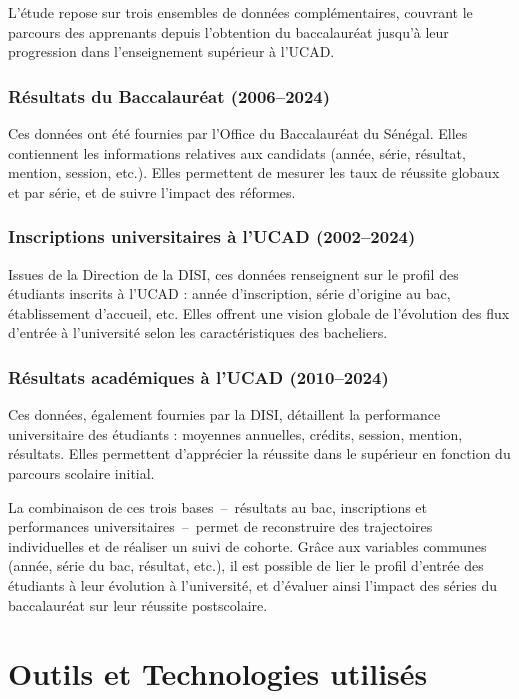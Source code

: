 L’étude repose sur trois ensembles de données complémentaires, couvrant le parcours des apprenants depuis l’obtention du baccalauréat jusqu’à leur progression dans l’enseignement supérieur à l’UCAD.

\subsubsection{Résultats du Baccalauréat (2006--2024)}

Ces données ont été fournies par l’Office du Baccalauréat du Sénégal. 
Elles contiennent les informations relatives aux candidats (année, série, résultat, mention, session, etc.). 
Elles permettent de mesurer les taux de réussite globaux et par série, et de suivre l’impact des réformes.

\subsubsection{Inscriptions universitaires à l’UCAD (2002--2024)}

Issues de la Direction de la DISI, ces données renseignent sur le profil des étudiants inscrits à l’UCAD : année d’inscription, série d’origine au bac, établissement d’accueil, etc. 
Elles offrent une vision globale de l’évolution des flux d’entrée à l’université selon les caractéristiques des bacheliers.

\subsubsection{Résultats académiques à l’UCAD (2010--2024)}

Ces données, également fournies par la DISI, détaillent la performance universitaire des étudiants : moyennes annuelles, crédits, session, mention, résultats. 
Elles permettent d’apprécier la réussite dans le supérieur en fonction du parcours scolaire initial.

\bigskip

La combinaison de ces trois bases~--~résultats au bac, inscriptions et performances universitaires~--~permet de reconstruire des trajectoires individuelles et de réaliser un suivi de cohorte. 
Grâce aux variables communes (année, série du bac, résultat, etc.), il est possible de lier le profil d’entrée des étudiants à leur évolution à l’université, et d’évaluer ainsi l’impact des séries du baccalauréat sur leur réussite postscolaire.

\section{Outils et Technologies utilisés}

